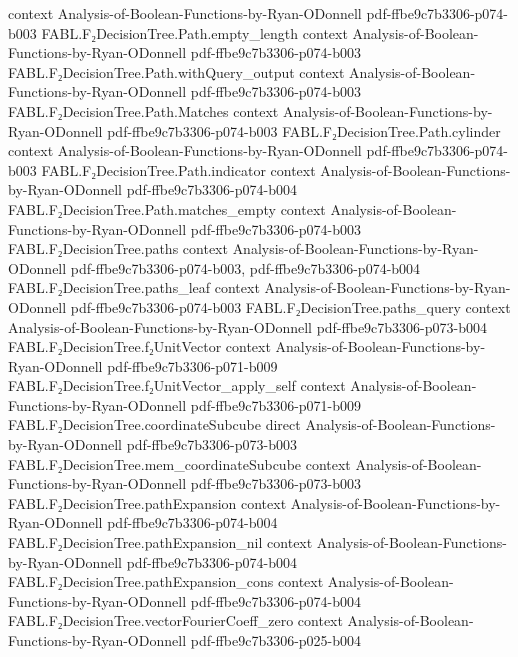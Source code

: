 \begin{theorem}
  {context}
  {Analysis-of-Boolean-Functions-by-Ryan-ODonnell}
  {pdf-ffbe9c7b3306-p074-b003}
\proofstep
  {FABL.F₂DecisionTree.Path.empty_length}
  {context}
  {Analysis-of-Boolean-Functions-by-Ryan-ODonnell}
  {pdf-ffbe9c7b3306-p074-b003}
\proofstep
  {FABL.F₂DecisionTree.Path.withQuery_output}
  {context}
  {Analysis-of-Boolean-Functions-by-Ryan-ODonnell}
  {pdf-ffbe9c7b3306-p074-b003}
\proofstep
  {FABL.F₂DecisionTree.Path.Matches}
  {context}
  {Analysis-of-Boolean-Functions-by-Ryan-ODonnell}
  {pdf-ffbe9c7b3306-p074-b003}
\proofstep
  {FABL.F₂DecisionTree.Path.cylinder}
  {context}
  {Analysis-of-Boolean-Functions-by-Ryan-ODonnell}
  {pdf-ffbe9c7b3306-p074-b003}
\proofstep
  {FABL.F₂DecisionTree.Path.indicator}
  {context}
  {Analysis-of-Boolean-Functions-by-Ryan-ODonnell}
  {pdf-ffbe9c7b3306-p074-b004}
\proofstep
  {FABL.F₂DecisionTree.Path.matches_empty}
  {context}
  {Analysis-of-Boolean-Functions-by-Ryan-ODonnell}
  {pdf-ffbe9c7b3306-p074-b003}
\proofstep
  {FABL.F₂DecisionTree.paths}
  {context}
  {Analysis-of-Boolean-Functions-by-Ryan-ODonnell}
  {pdf-ffbe9c7b3306-p074-b003,
    pdf-ffbe9c7b3306-p074-b004}
\proofstep
  {FABL.F₂DecisionTree.paths_leaf}
  {context}
  {Analysis-of-Boolean-Functions-by-Ryan-ODonnell}
  {pdf-ffbe9c7b3306-p074-b003}
\proofstep
  {FABL.F₂DecisionTree.paths_query}
  {context}
  {Analysis-of-Boolean-Functions-by-Ryan-ODonnell}
  {pdf-ffbe9c7b3306-p073-b004}
\proofstep
  {FABL.F₂DecisionTree.f₂UnitVector}
  {context}
  {Analysis-of-Boolean-Functions-by-Ryan-ODonnell}
  {pdf-ffbe9c7b3306-p071-b009}
\proofstep
  {FABL.F₂DecisionTree.f₂UnitVector_apply_self}
  {context}
  {Analysis-of-Boolean-Functions-by-Ryan-ODonnell}
  {pdf-ffbe9c7b3306-p071-b009}
\proofstep
  {FABL.F₂DecisionTree.coordinateSubcube}
  {direct}
  {Analysis-of-Boolean-Functions-by-Ryan-ODonnell}
  {pdf-ffbe9c7b3306-p073-b003}
\proofstep
  {FABL.F₂DecisionTree.mem_coordinateSubcube}
  {context}
  {Analysis-of-Boolean-Functions-by-Ryan-ODonnell}
  {pdf-ffbe9c7b3306-p073-b003}
\proofstep
  {FABL.F₂DecisionTree.pathExpansion}
  {context}
  {Analysis-of-Boolean-Functions-by-Ryan-ODonnell}
  {pdf-ffbe9c7b3306-p074-b004}
\proofstep
  {FABL.F₂DecisionTree.pathExpansion_nil}
  {context}
  {Analysis-of-Boolean-Functions-by-Ryan-ODonnell}
  {pdf-ffbe9c7b3306-p074-b004}
\proofstep
  {FABL.F₂DecisionTree.pathExpansion_cons}
  {context}
  {Analysis-of-Boolean-Functions-by-Ryan-ODonnell}
  {pdf-ffbe9c7b3306-p074-b004}
\proofstep
  {FABL.F₂DecisionTree.vectorFourierCoeff_zero}
  {context}
  {Analysis-of-Boolean-Functions-by-Ryan-ODonnell}
  {pdf-ffbe9c7b3306-p025-b004}

\end{theorem}
